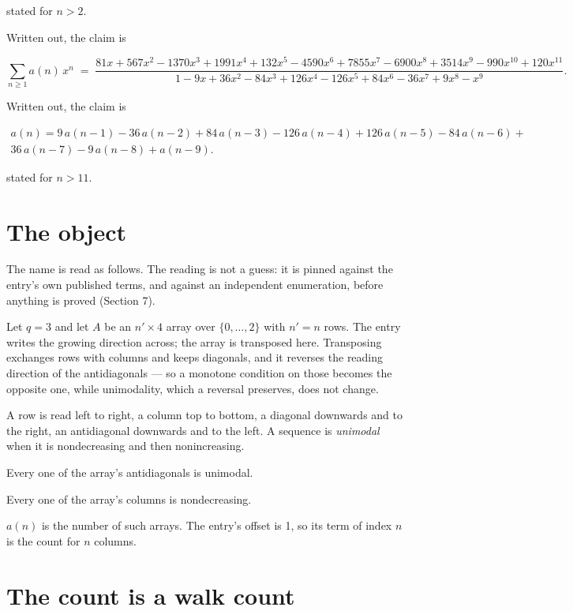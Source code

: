 \documentclass[11pt]{article}
\theoremstyle{definition}
\begin{document}
stated for $n > 2$.

Written out, the claim is

\[\sum_{n \ge 1} a(n)\,x^n \;=\; \frac{81x + 567x^{2} - 1370x^{3} + 1991x^{4} + 132x^{5} - 4590x^{6} + 7855x^{7} - 6900x^{8} + 3514x^{9} - 990x^{10} + 120x^{11}}{1 - 9x + 36x^{2} - 84x^{3} + 126x^{4} - 126x^{5} + 84x^{6} - 36x^{7} + 9x^{8} - x^{9}}.\]

Written out, the claim is

\begin{multline*} a(n) = 9\,a(n-1) - 36\,a(n-2) + 84\,a(n-3) - 126\,a(n-4) + 126\,a(n-5) - 84\,a(n-6) + \\ 36\,a(n-7) - 9\,a(n-8) + a(n-9). \end{multline*}

stated for $n > 11$.

\section{The object}

The name is read as follows. The reading is not a guess: it is pinned against the entry's own published terms, and against an independent enumeration, before anything is proved (Section 7).

Let $q = 3$ and let $A$ be an $n' \times 4$ array over $\{0,\dots,2\}$ with $n' = n$ rows. The entry writes the growing direction across; the array is transposed here. Transposing exchanges rows with columns and keeps diagonals, and it reverses the reading direction of the antidiagonals --- so a monotone condition on those becomes the opposite one, while unimodality, which a reversal preserves, does not change.

A row is read left to right, a column top to bottom, a diagonal downwards and to the right, an antidiagonal downwards and to the left. A sequence is {\itshape unimodal} when it is nondecreasing and then nonincreasing.

Every one of the array's antidiagonals is unimodal.

Every one of the array's columns is nondecreasing.

$a(n)$ is the number of such arrays. The entry's offset is 1, so its term of index $n$ is the count for $n$ columns.

\section{The count is a walk count}
\end{document}
